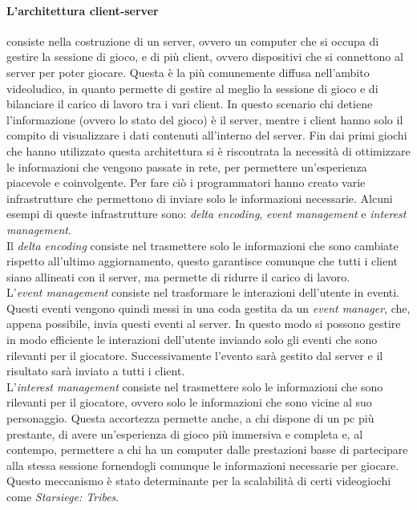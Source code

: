         \paragraph{L'architettura client-server} consiste nella costruzione di un server, ovvero un computer che si occupa di gestire la sessione di gioco, e di più client, ovvero
            dispositivi che si connettono al server per poter giocare. Questa è la più comunemente diffusa nell'ambito videoludico, in quanto permette di gestire al meglio la
            sessione di gioco e di bilanciare il carico di lavoro tra i vari client. In questo scenario chi detiene l'informazione (ovvero lo stato del gioco) è il server, mentre
            i client hanno solo il compito di visualizzare i dati contenuti all'interno del server. Fin dai primi giochi che hanno utilizzato questa architettura
            si è riscontrata la necessità di ottimizzare le informazioni che vengono passate in rete, per permettere un'esperienza piacevole e coinvolgente. Per fare ciò i 
            programmatori hanno creato varie infrastrutture che permettono di inviare solo le informazioni necessarie. Alcuni esempi di queste infrastrutture sono: 
            \textit{delta encoding}, \textit{event management} e \textit{interest management}.\\
            Il \textit{delta encoding} consiste nel trasmettere solo le informazioni che sono cambiate rispetto all'ultimo aggiornamento, questo garantisce comunque che tutti
            i client siano allineati con il server, ma permette di ridurre il carico di lavoro.\\
            L'\textit{event management} consiste nel trasformare le interazioni dell'utente in eventi. Questi eventi vengono quindi messi in una coda gestita da un 
            \textit{event manager}, che, appena possibile, invia questi eventi al server. In questo modo si possono gestire in modo efficiente le interazioni dell'utente inviando
            solo gli eventi che sono rilevanti per il giocatore. Successivamente l'evento sarà gestito dal server e il risultato sarà inviato a tutti i client.\\
            L'\textit{interest management} consiste nel trasmettere solo le informazioni che sono rilevanti per il giocatore, ovvero solo le informazioni che sono vicine al suo 
            personaggio. Questa accortezza permette anche, a chi dispone di un pc più prestante, di avere un'esperienza di gioco più immersiva e completa e, al contempo, permettere 
            a chi ha un computer dalle prestazioni basse di partecipare alla stessa sessione fornendogli comunque le informazioni necessarie per giocare. Questo meccanismo è stato
            determinante per la scalabilità di certi videogiochi come \textit{Starsiege: Tribes}.\\

